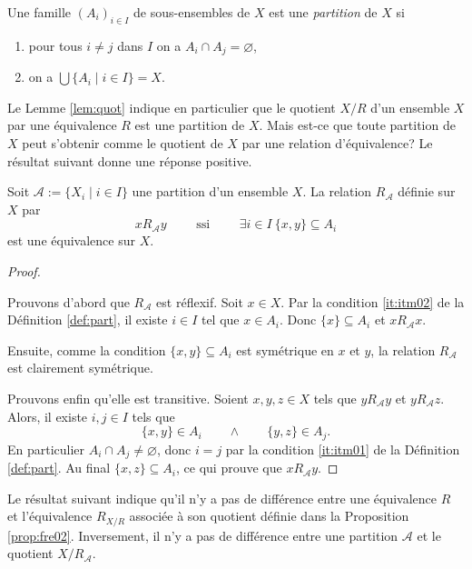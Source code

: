\documentclass[french,course,oneside,theoremnosection]{lecture}
\begin{document}
\begin{definition}
\begin{definition}\label{def:part}
Une famille $(A_i)_{i\in I}$ de sous-ensembles de $X$ est une  \emph{partition} de $X$ si
\begin{enumerate}
\item\label{it:itm01} pour tous $i \neq j$ dans $I$ on a $A_i \cap A_j = \varnothing$,
\item\label{it:itm02} on a $\bigcup\{A_i \mid i \in I\}=X$.
\end{enumerate}
\end{definition}

Le Lemme \ref{lem:quot} indique en particulier que le quotient $X/R$ d'un ensemble $X$ par une équivalence $R$ est une partition de $X$.  Mais est-ce que toute partition de $X$ peut s'obtenir comme le quotient de $X$ par une relation d'équivalence? Le résultat suivant donne une réponse positive.

\begin{proposition}
Soit $\mathcal{A}:=\{X_i \mid i \in I\}$ une partition d'un ensemble $X$. La relation $R_{\mathcal{A}}$ définie sur $X$ par
\[
xR_{\mathcal{A}}y \qquad \text{ ssi } \qquad \exists i\in I \ \{x,y\}\subseteq A_i 
\]
est une équivalence sur $X$.
\end{proposition}

\begin{proof}\label{prop:fre02}

Prouvons d'abord que $R_{\mathcal{A}}$ est réflexif. Soit $x\in X$. Par la condition \ref{it:itm02} de la Définition \ref{def:part}, il existe $i\in I$ tel que $x\in A_i$. Donc $\{x\} \subseteq A_i$ et $xR_{\mathcal{A}}x$.

Ensuite, comme la condition $\{x,y\}\subseteq A_i$ est symétrique en $x$ et $y$, la relation $R_{\mathcal{A}}$ est clairement symétrique.

Prouvons enfin qu'elle est transitive. Soient $x,y,z\in X$ tels que $yR_{\mathcal{A}}y$ et $yR_{\mathcal{A}}z$. Alors, il existe $i,j \in I$ tels que
\[
\{x,y\}\in A_i \qquad \wedge \qquad \{y,z\}\in A_j.
\]
En particulier $A_i \cap A_j\neq \varnothing$, donc $i=j$ par la condition \ref{it:itm01} de la Définition \ref{def:part}. Au final $\{x,z\}\subseteq A_i$, ce qui prouve que $xR_{\mathcal{A}}y$.
\end{proof}

Le résultat suivant indique qu'il n'y a pas de différence entre une équivalence $R$ et l'équivalence  $R_{X{/}R}$ associée à son quotient définie dans la Proposition \ref{prop:fre02}. Inversement, il n'y a pas de différence entre une partition $\mathcal{A}$ et le quotient $X/R_{\mathcal{A}}$.


\end{definition}
\end{document}

